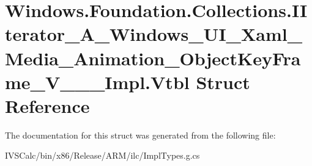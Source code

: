 \hypertarget{struct_windows_1_1_foundation_1_1_collections_1_1_i_iterator___a___windows___u_i___xaml___media_a7e3f681b98d44f5780554c9901ec5df}{}\section{Windows.\+Foundation.\+Collections.\+I\+Iterator\+\_\+\+A\+\_\+\+Windows\+\_\+\+U\+I\+\_\+\+Xaml\+\_\+\+Media\+\_\+\+Animation\+\_\+\+Object\+Key\+Frame\+\_\+\+V\+\_\+\+\_\+\+\_\+\+Impl.\+Vtbl Struct Reference}
\label{struct_windows_1_1_foundation_1_1_collections_1_1_i_iterator___a___windows___u_i___xaml___media_a7e3f681b98d44f5780554c9901ec5df}


The documentation for this struct was generated from the following file\+:\begin{DoxyCompactItemize}
\item 
I\+V\+S\+Calc/bin/x86/\+Release/\+A\+R\+M/ilc/Impl\+Types.\+g.\+cs\end{DoxyCompactItemize}

